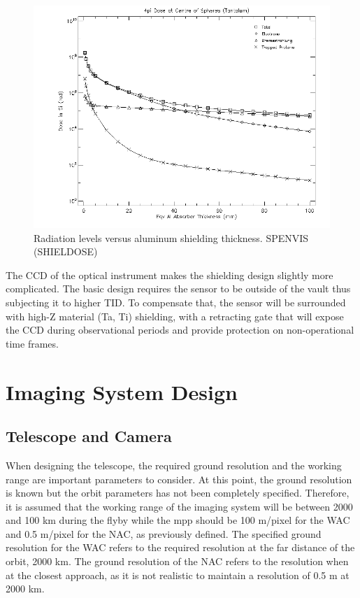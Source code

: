 \begin{figure}[htb!]
\centering
\includegraphics[scale=0.4]{figures/Orbiter/alvsrad.png}
\caption{Radiation levels versus aluminum shielding thickness. SPENVIS (SHIELDOSE)}
\label{fig:shield}
\end{figure}
The CCD of the optical instrument makes the shielding design slightly more complicated. The basic design requires the sensor to be outside of the vault thus subjecting it to higher TID. To compensate that, the sensor will be surrounded with high-Z material (Ta, Ti) shielding, with a retracting gate that will expose the CCD during observational periods and provide protection on non-operational time frames.
\newpage
\section{Imaging System Design}
\subsection{Telescope and Camera}
When designing the telescope, the required ground resolution and the working range are important parameters to consider. At this point, the ground resolution is known but the orbit parameters has not been completely specified. Therefore, it is assumed that the working range of the imaging system will be between 2000 and 100 km during the flyby while the mpp should be 100 m/pixel for the WAC and 0.5 m/pixel for the NAC, as previously defined.
The specified ground resolution for the WAC refers to the required resolution at the far distance of the orbit, 2000 km. The ground resolution of the NAC refers to the resolution when at the closest approach, as it is not realistic to maintain a resolution of 0.5 m at 2000 km. 


